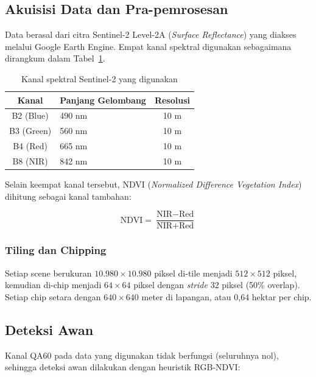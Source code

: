\documentclass[12pt,a4paper]{article}
\begin{document}
\subsection{Akuisisi Data dan Pra-pemrosesan}

Data berasal dari citra Sentinel-2 Level-2A (\textit{Surface Reflectance}) yang
diakses melalui Google Earth Engine. Empat kanal spektral digunakan sebagaimana
dirangkum dalam Tabel~\ref{tab:bands}.

\begin{table}[H]
\centering
\caption{Kanal spektral Sentinel-2 yang digunakan}
\label{tab:bands}
\begin{tabular}{clc}
\toprule
\textbf{Kanal} & \textbf{Panjang Gelombang} & \textbf{Resolusi} \\
\midrule
B2 (Blue) & 490 nm & 10 m \\
B3 (Green) & 560 nm & 10 m \\
B4 (Red) & 665 nm & 10 m \\
B8 (NIR) & 842 nm & 10 m \\
\bottomrule
\end{tabular}
\end{table}

Selain keempat kanal tersebut, NDVI (\textit{Normalized Difference Vegetation
Index}) dihitung sebagai kanal tambahan:

\begin{equation}
    \label{eq:ndvi}
    \text{NDVI} = \frac{\text{NIR} - \text{Red}}{\text{NIR} + \text{Red}}
\end{equation}

\subsubsection{Tiling dan Chipping}

Setiap scene berukuran $10.980 \times 10.980$ piksel di-tile menjadi
$512 \times 512$ piksel, kemudian di-chip menjadi $64 \times 64$ piksel dengan
\textit{stride} 32 piksel (50\% overlap). Setiap chip setara dengan
$640 \times 640$ meter di lapangan, atau 0,64 hektar per chip.

\subsection{Deteksi Awan}

Kanal QA60 pada data yang digunakan tidak berfungsi (seluruhnya nol), sehingga
deteksi awan dilakukan dengan heuristik RGB-NDVI:
\end{document}
